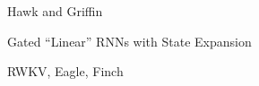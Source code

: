 \begin{slidewhite}[\slideopts,toc={Hawk \& Griffin}]{Hawk and Griffin}
\vspace{-6em}
\end{slidewhite}

\begin{slidewhite}[\slideopts,toc={HGRN2}]{Gated ``Linear'' RNNs with State Expansion}
\vspace{-6em}
\end{slidewhite}

\begin{slidewhite}[\slideopts,toc={RWKV+}]{RWKV, Eagle, Finch}
\vspace{-6em}
\end{slidewhite}


%
%
%
%


\endinput
